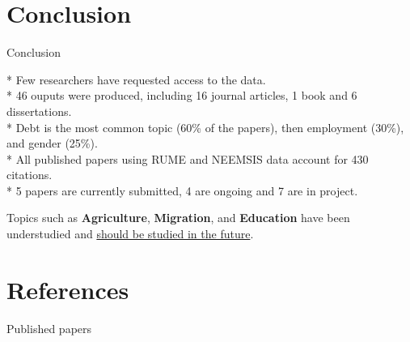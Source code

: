 \documentclass[aspectratio=169]{beamer}
\begin{document}
\section*{Conclusion}
\begin{frame}
\label{conclusion}


\end{frame}


\begin{frame}{Conclusion}
\begin{small}

\begin{brickbox}
* Few researchers have requested access to the data. \\
* 46 ouputs were produced, including 16 journal articles, 1 book and 6 dissertations. \\
* Debt is the most common topic (60\% of the papers), then employment (30\%), and gender (25\%). \\
* All published papers using RUME and NEEMSIS data account for 430 citations. \\
* 5 papers are currently submitted, 4 are ongoing and 7 are in project.	
\end{brickbox}

\vspace*{3em}
Topics such as \textbf{Agriculture}, \textbf{Migration}, and \textbf{Education} have been understudied and \underline{should be studied in the future}.

\end{small}
\end{frame}




\section*{References}
\begin{frame}
\label{references}


\end{frame}



\begin{frame}{Published papers}

\printbibliography[keyword={published},heading=none,resetnumbers=true]

\end{frame}
\end{document}

